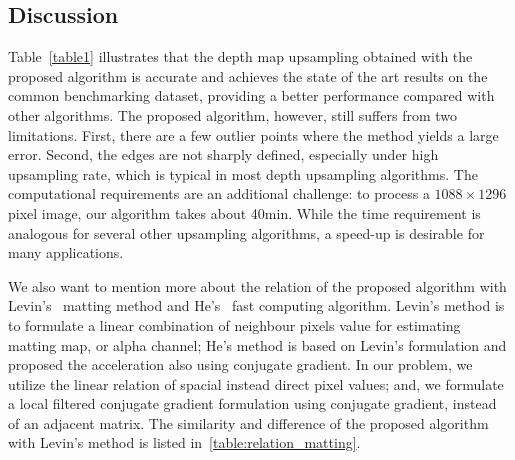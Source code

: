 \subsection{Discussion}
\label{sec:2.discussion}
Table~\ref{table1} illustrates that the depth map upsampling obtained with the proposed algorithm is accurate and achieves the state of the art results on the common benchmarking dataset, providing a better performance compared with other algorithms. The proposed algorithm, however, still suffers from two limitations. First, there are a few outlier points where the method yields a large error. Second, the edges are not sharply defined, especially under high upsampling rate, which is typical in most depth upsampling algorithms. The computational requirements are an additional challenge: to process a $1088\times 1296$ pixel image, our algorithm takes about 40min. While the time requirement is analogous for several other upsampling algorithms, a speed-up is desirable for many applications. 

We also want to mention more about the relation of the proposed algorithm with Levin's~\cite{levin2008closed} matting method and He's~\cite{he2010fast} fast computing algorithm. Levin's method is to formulate a linear combination of neighbour pixels value for estimating matting map, or alpha channel; He's method is based on Levin's formulation and proposed the acceleration also using conjugate gradient. In our problem, we utilize the linear relation of spacial instead direct pixel values; and, we formulate a local filtered conjugate gradient formulation using conjugate gradient, instead of an adjacent matrix. The similarity and difference of the proposed algorithm with Levin's method is listed in~\ref{table:relation_matting}.  

\begin{table}[htb]
\centering
{}
\caption{Similarity and difference of the proposed algorithm with Levin's method~\cite{levin2008closed.}}
\label{table:relation_matting}
\end{table}

